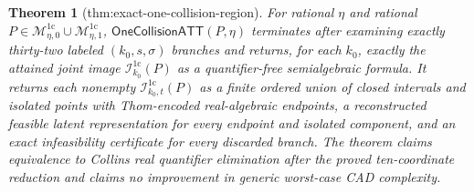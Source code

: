 \documentclass{article}
\newtheorem{theorem}{Theorem}
\begin{document}
\begin{theorem}[thm:exact-one-collision-region]\label{thm:exact-one-collision-region}
For rational \(\eta\) and rational \(P\in\mathcal M_{\eta,0}^{1\mathrm c}\cup\mathcal M_{\eta,1}^{1\mathrm c}\), \(\mathsf{OneCollisionATT}(P,\eta)\) terminates after examining exactly thirty-two labeled \((k_0,s,\sigma)\) branches and returns, for each \(k_0\), exactly the attained joint image \(\mathcal I_{k_0}^{1\mathrm c}(P)\) as a quantifier-free semialgebraic formula. It returns each nonempty \(\mathcal I_{k_0,t}^{1\mathrm c}(P)\) as a finite ordered union of closed intervals and isolated points with Thom-encoded real-algebraic endpoints, a reconstructed feasible latent representation for every endpoint and isolated component, and an exact infeasibility certificate for every discarded branch. The theorem claims equivalence to Collins real quantifier elimination after the proved ten-coordinate reduction and claims no improvement in generic worst-case CAD complexity.
\end{theorem}
\end{document}
